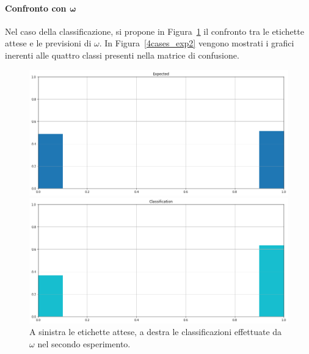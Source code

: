 \documentclass[12pt]{report}
\theoremstyle{definition}
\begin{document}
\paragraph{Confronto con $\bm{\omega}$}
Nel caso della classificazione, si propone in Figura~\ref{classification_exp2} il confronto tra le etichette attese e le previsioni di $\omega$. 
In Figura~\ref{4cases_exp2} vengono mostrati i grafici inerenti alle quattro classi presenti nella matrice di confusione.
\begin{figure}
\centering
    \begin{minipage}{0.48\textwidth}
        \includegraphics[width=\linewidth]{images/experiment_beta5_disgiunti/expected_classification.png}
    \end{minipage}
    \begin{minipage}{0.48\textwidth}
        \includegraphics[width=\linewidth]{images/experiment_beta5_disgiunti/prediction_classification.png}
    \end{minipage}
    \caption{A sinistra le etichette attese, a destra le classificazioni effettuate da $\omega$ nel secondo esperimento.}
    \label{classification_exp2}
\end{figure}
\end{document}
